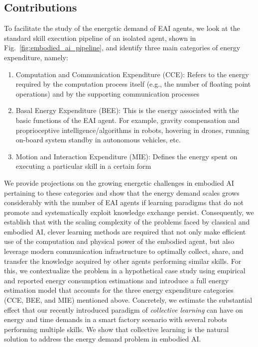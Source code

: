 \subsection{Contributions}
To facilitate the study of the energetic demand of EAI agents, we look at the standard skill execution pipeline of an isolated agent, shown in Fig.~\ref{fig:embodied_ai_pipeline}, and identify three main categories of energy expenditure, namely:
\begin{enumerate}
	\item Computation and Communication Expenditure (CCE): Refers to the energy required by the computation process itself (e.g., the number of floating point operations) and by the supporting communication processes
	\item Basal Energy Expenditure (BEE): This is the energy associated with the basic functions of the EAI agent. For example, gravity compensation and proprioceptive intelligence/algorithms in robots, hovering in drones, running on-board system standby in autonomous vehicles, etc.
	\item Motion and Interaction Expenditure (MIE): Defines the energy spent on executing a particular skill in a certain form
\end{enumerate}
We provide projections on the growing energetic challenges in embodied AI pertaining to these categories and show that the energy demand scales grows considerably with the number of EAI agents if learning paradigms that do not promote and systematically exploit knowledge exchange persist. Consequently, we establish that with the scaling complexity of the problems faced by classical and embodied AI, clever learning methods are required that not only make efficient use of the computation and physical power of the embodied agent, but also leverage modern communication infrastructure to optimally collect, share, and transfer the knowledge acquired by other agents performing similar skills. For this, we contextualize the problem in a hypothetical case study using empirical and reported energy consumption estimations and introduce a full energy estimation model that accounts for the three energy expenditure categories (CCE, BEE, and MIE) mentioned above. Concretely, we estimate the substantial effect that our recently introduced paradigm of \emph{collective learning} can have on energy and time demands in a smart factory scenario with several robots performing multiple skills. We show that collective learning is the natural solution to address the energy demand problem in embodied AI.

